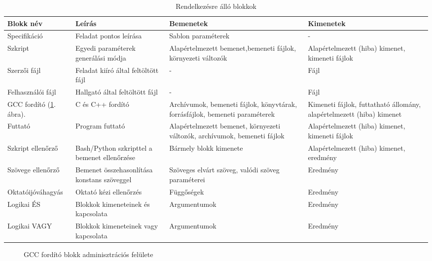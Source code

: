 \begin{table}[p]
    \begin{tabularx}{\textwidth}{X|X|X|X}
        Blokk név 			& Leírás & Bemenetek & Kimenetek \\\hline
        Specifikáció 		& Feladat pontos leírása & Sablon paraméterek & - \\\hline
        Szkript 			& Egyedi paraméterek generálási módja & Alapértelmezett bemenet,\newline bemeneti fájlok, környezeti változók  & Alapértelmezett (hiba) kimenet, kimeneti fájlok \\\hline
        Szerzői fájl 		& Feladat kiíró által feltöltött fájl & - & Fájl\\\hline
        Felhasználói fájl 	& Hallgató által feltöltött fájl & - & Fájl \\\hline
        GCC fordító (\ref{fig:exercise_blokk}. ábra). 		& C és C++ fordító & Archívumok, bemeneti fájlok, könyvtárak, forrásfájlok, bemeneti paraméterek & Kimeneti fájlok, futtatható állomány, alapértelmezett (hiba) kimenet \\\hline
        Futtató 			& Program futtató & Alapértelmezett bemenet, környezeti változók, archívumok, bemeneti fájlok  & Alapértelmezett (hiba) kimenet, kimeneti fájlok \\\hline
        Szkript ellenőrző 	& Bash/Python szkripttel a bemenet ellenőrzése & Bármely blokk kimenete & Alapértelmezett (hiba) kimenet, eredmény \\\hline
        Szövege ellenőrző 	& Bemenet összehasonlítása konstans szöveggel & Szöveges elvárt szöveg, valódi szöveg paraméterei & Eredmény \\\hline
        Oktatói\newline jóváhagyás 	& Oktató kézi ellenőrzés & Függőségek & Eredmény \\\hline
        Logikai ÉS 			& Blokkok kimeneteinek és kapcsolata & Argumentumok & Eredmény \\\hline
        Logikai VAGY 		& Blokkok kimeneteinek vagy kapcsolata & Argumentumok & Eredmény \\\hline
    \end{tabularx}
    \caption{Rendelkezésre álló blokkok}				
    \label{table:blocks}
\end{table}

\begin{figure}[h]
    \centering
    \caption{GCC fordító blokk adminisztrációs felülete}
    \label{fig:exercise_blokk}
\end{figure}

